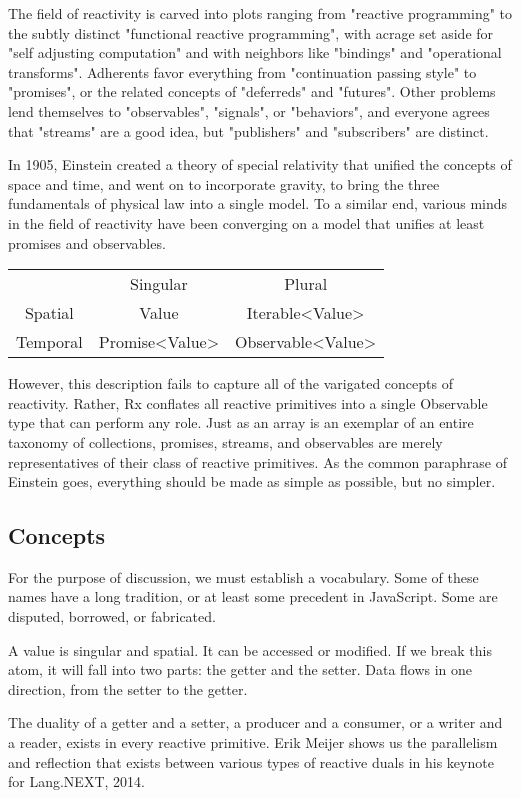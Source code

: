 The field of reactivity is carved into plots ranging from "reactive programming" to the subtly distinct "functional reactive programming", with acrage set aside for "self adjusting computation" and with neighbors like "bindings" and "operational transforms". Adherents favor everything from "continuation passing style" to "promises", or the related concepts of "deferreds" and "futures". Other problems lend themselves to "observables", "signals", or "behaviors", and everyone agrees that "streams" are a good idea, but "publishers" and "subscribers" are distinct.

In 1905, Einstein created a theory of special relativity that unified the concepts of space and time, and went on to incorporate gravity, to bring the three fundamentals of physical law into a single model. To a similar end, various minds in the field of reactivity have been converging on a model that unifies at least promises and observables.
\begin{tabular}{| c | c | c |}
 	& Singular & Plural \\
 Spatial &	Value & Iterable<Value> \\
 Temporal	 & Promise<Value>	& Observable<Value>\\
\end{tabular}

However, this description fails to capture all of the varigated concepts of reactivity. Rather, Rx conflates all reactive primitives into a single Observable type that can perform any role. Just as an array is an exemplar of an entire taxonomy of collections, promises, streams, and observables are merely representatives of their class of reactive primitives. As the common paraphrase of Einstein goes, everything should be made as simple as possible, but no simpler.

\subsection{Concepts}

For the purpose of discussion, we must establish a vocabulary. Some of these names have a long tradition, or at least some precedent in JavaScript. Some are disputed, borrowed, or fabricated.

A value is singular and spatial. It can be accessed or modified. If we break this atom, it will fall into two parts: the getter and the setter. Data flows in one direction, from the setter to the getter.

The duality of a getter and a setter, a producer and a consumer, or a writer and a reader, exists in every reactive primitive. Erik Meijer shows us the parallelism and reflection that exists between various types of reactive duals in his keynote for Lang.NEXT, 2014.

